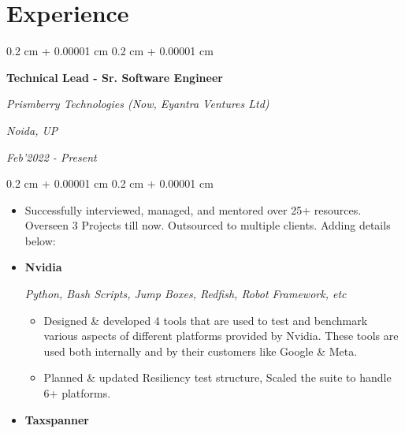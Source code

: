 \documentclass[10pt, letterpaper]{article}
\newenvironment{highlights}{
    \begin{itemize}[
        topsep=0.10 cm,
        parsep=0.10 cm,
        partopsep=0pt,
        itemsep=0pt,
        leftmargin=0.4 cm + 10pt
    ]
}{
    \end{itemize}
} %
\newenvironment{onecolentry}{
    \begin{adjustwidth}{
        0.2 cm + 0.00001 cm
    }{
        0.2 cm + 0.00001 cm
    }
}{
    \end{adjustwidth}
} %
\newenvironment{twocolentry}[2][]{
    \onecolentry
    \def\secondColumn{#2}
    \setcolumnwidth{\fill, 4.5 cm}
    \begin{paracol}{2}
}{
    \switchcolumn \raggedleft \secondColumn
    \end{paracol}
    \endonecolentry
} %
\begin{document}
    \section{Experience}
        
        \begin{twocolentry}{
        \textit{Noida, UP}    
            
        \textit{Feb’2022 - Present}}
            \textbf{Technical Lead - Sr. Software Engineer}
            
            \textit{Prismberry Technologies (Now, Eyantra Ventures Ltd)}
        \end{twocolentry}

        \vspace{0.10 cm}
        \begin{onecolentry}
            \begin{highlights}
                \item Successfully interviewed, managed, and mentored over 25+ resources. Overseen 3 Projects till now. Outsourced to multiple clients. Adding details below:
                \item \begin{minipage}[t]{0.24\textwidth}
                        \raggedright
                        \textbf{Nvidia}
                        \end{minipage}%
                        \begin{minipage}[t]{0.70\textwidth}
                        \raggedleft
                        \small \textit{Python, Bash Scripts, Jump Boxes, Redfish, Robot Framework, etc}
                        \end{minipage}
                \begin{highlights}
                    \item Designed \& developed 4 tools that are used to test and benchmark various aspects of different platforms provided by Nvidia. These tools are used both internally and by their customers like Google \& Meta.
                    \item Planned \& updated Resiliency test structure, Scaled the suite to handle 6+ platforms.
                \end{highlights}
                \item \begin{minipage}[t]{0.24\textwidth}
                        \raggedright
                        \textbf{Taxspanner}
                        \end{minipage}%

\end{highlights}
\end{onecolentry}
\end{document}
